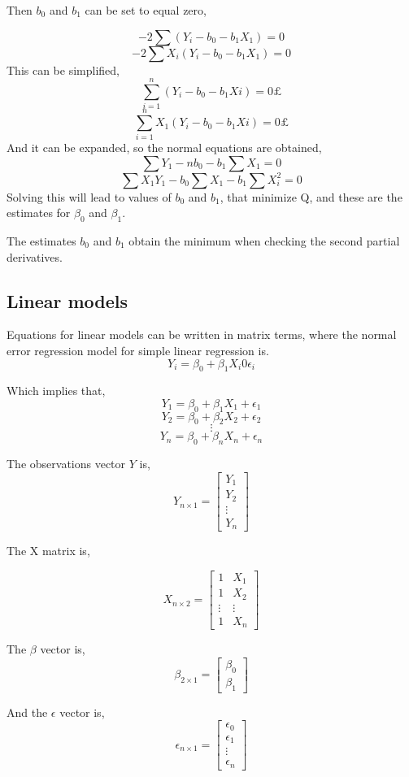 	Then $b_0$ and $b_1$ can be set to equal zero, 
	
	$$-2 \sum (Y_i - b_0 - b_1 X_1)=0$$
	$$-2\sum X_i(Y_i - b_0 - b_1 X_1)=0$$
	This can be simplified, 
	$$\sum_{i=1}^{n} (Y_i - b_0 - b_1 Xi)=0£$$
	$$\sum_{i=1}^{n} X_1(Y_i - b_0 - b_1 Xi)=0£$$
	And it can be expanded, so the normal equations are obtained, 
	$$\sum Y_1 - n b_0 - b_1 \sum X_1 =0$$
	$$\sum X_1 Y_1  - b_0 \sum X_1 - b_1 \sum X_i^2 =0$$
	Solving this will lead to values of $b_0$ and $b_1$, that minimize Q, and these are the estimates for $\beta_0$ and $\beta_1$. 
	
	The estimates $b_0$ and $b_1$ obtain the minimum when checking the second partial derivatives. \newline
	
	
	\subsection{Linear models}
	
	Equations for linear models can be written in matrix terms, where the normal error regression model for simple linear regression is.
	$$Y_i = \beta_0 + \beta_1 X_i 0 \epsilon_i $$ 
	
	
	Which implies that,
	$$Y_1 = \beta_0 + \beta_1 X_1 + \epsilon_1$$
	$$Y_2 = \beta_0 + \beta_2 X_2 + \epsilon_2$$
	$$\vdots$$
	$$Y_n = \beta_0 + \beta_n X_n + \epsilon_n$$
	
	The observations vector $Y$ is,
	$$ Y_{n \times 1} =
	\left[
	\begin{array}{c}
		Y_1 \\ 
		Y_2 \\ 
		\vdots \\
		Y_n 
	\end{array}
	\right]
	$$	
	
	The X matrix is, 
	
	$$X_{n \times 2}=
	\left[
	\begin{array}{cc}
		1 & X_1 \\ 
		1 & X_2 \\ 
		\vdots & \vdots \\
		1 & X_n
	\end{array}
	\right]
	$$
	
	
	The $\beta$ vector is, 
	$$ \beta_{2 \times 1} =
	\left[
	\begin{array}{c}
		\beta_0 \\ 
		\beta_1 
	\end{array}
	\right]
	$$
	
	And the $\epsilon$ vector is,
	$$ \epsilon_{n \times 1} =
	\left[
	\begin{array}{c}
		\epsilon_0 \\ 
		\epsilon_1 \\
		\vdots \\
		\epsilon_n 
	\end{array}
	\right]
	$$
	

